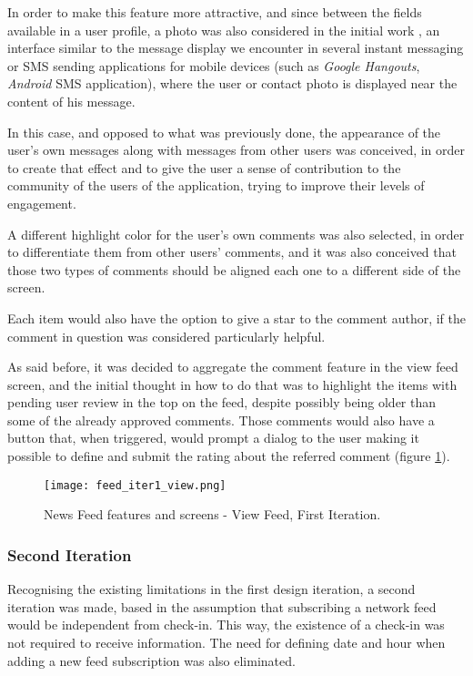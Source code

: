 In order to make this feature more attractive, and since between the fields available in a user profile, a photo was also considered in the initial work \cite{kn:Gon12}, an interface similar to the message display we encounter in several instant messaging or SMS sending applications for mobile devices (such as \emph{Google Hangouts}, \emph{Android} SMS application), where the user or contact photo is displayed near the content of his message.

In this case, and opposed to what was previously done, the appearance of the user's own messages along with messages from other users was conceived, in order to create that effect and to give the user a sense of contribution to the community of the users of the application, trying to improve their levels of engagement.

A different highlight color for the user's own comments was also selected, in order to differentiate them from other users' comments, and it was also conceived that those two types of comments should be aligned each one to a different side of the screen.

Each item would also have the option to give a star to the comment author, if the comment in question was considered particularly helpful. 


As said before, it was decided to aggregate the comment feature in the view feed screen, and the initial thought in how to do that was to highlight the items with pending user review in the top on the feed, despite possibly being older than some of the already approved comments. Those comments would also have a button that, when triggered, would prompt a dialog to the user making it possible to define and submit the rating about the referred comment (figure \ref{fig:feed_iter1_view}).

\begin{figure}[htb]
  \begin{center}
    \leavevmode
    \texttt{[image: feed\_iter1\_view.png]}
    \caption{News Feed features and screens - View Feed, First Iteration.}
    \label{fig:feed_iter1_view}
  \end{center}
\end{figure}




\subsubsection{Second Iteration}

Recognising the existing limitations in the first design iteration,  a second iteration was made, based in the assumption that subscribing a network feed would be independent from check-in. This way, the existence of a check-in was not required to receive information. The need for defining date and hour when adding a new feed subscription was also eliminated.

